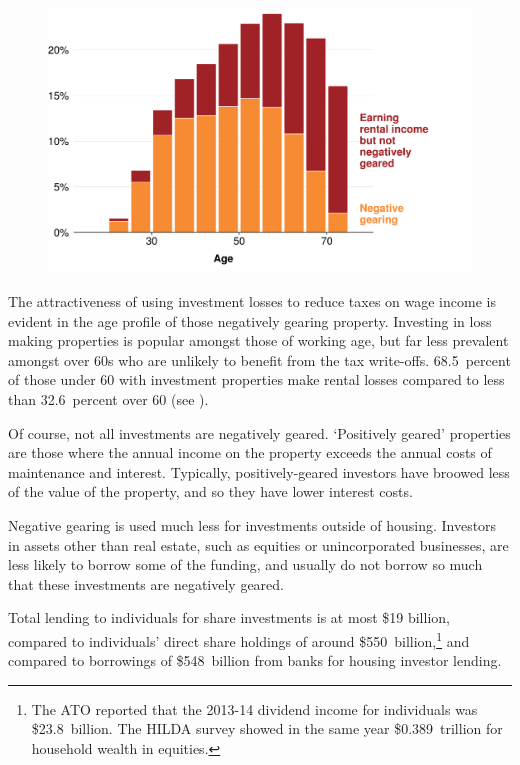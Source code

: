 \documentclass{grattan}\usepackage[]{graphicx}\usepackage[]{color}
\begin{document}
\begin{figure}[!htb]

\includegraphics[width=\columnwidth]{CGT-NG-atlas//NG-PG-by-age-1}

\end{figure}

The attractiveness of using investment losses to reduce taxes on wage
income is evident in the age profile of those negatively gearing
property. Investing in loss making properties is popular amongst those
of working age, but far less prevalent amongst over 60s who are unlikely
to benefit from the tax write-offs. 68.5~percent of those under 60
with investment properties make rental losses compared to less than 32.6~percent over 60 (see ).

Of course, not all investments are negatively geared. `Positively geared' properties are those where the annual income on the property exceeds the annual costs of maintenance and interest. Typically, positively-geared investors have broowed less of the value of the property, and so they have lower interest costs.

Negative gearing is used much less for investments outside of housing. Investors in assets other than real estate, such as equities or unincorporated businesses, are less likely to borrow some of the funding, and usually do not borrow so much that these investments are negatively geared. 

Total lending to individuals for share investments is at most \$19 billion, compared to individuals' direct share holdings of around \$550~billion,\footnote{The ATO reported that the 2013-14 dividend income for individuals was \$23.8~billion. The HILDA survey showed in the same year \$0.389~trillion for household wealth in equities.}  and compared to borrowings of \$548~billion from banks for housing investor lending. 
\end{document}
